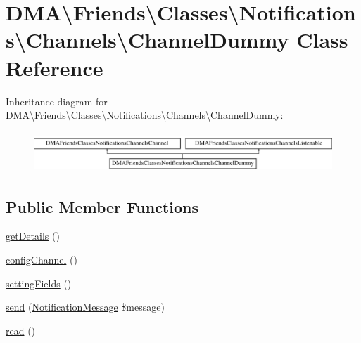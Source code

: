 \hypertarget{classDMA_1_1Friends_1_1Classes_1_1Notifications_1_1Channels_1_1ChannelDummy}{}\section{D\+M\+A\textbackslash{}Friends\textbackslash{}Classes\textbackslash{}Notifications\textbackslash{}Channels\textbackslash{}Channel\+Dummy Class Reference}
\label{classDMA_1_1Friends_1_1Classes_1_1Notifications_1_1Channels_1_1ChannelDummy}
Inheritance diagram for D\+M\+A\textbackslash{}Friends\textbackslash{}Classes\textbackslash{}Notifications\textbackslash{}Channels\textbackslash{}Channel\+Dummy\+:\begin{figure}[H]
\begin{center}
\leavevmode
\includegraphics[height=1.530055cm]{df/dc6/classDMA_1_1Friends_1_1Classes_1_1Notifications_1_1Channels_1_1ChannelDummy}
\end{center}
\end{figure}
\subsection*{Public Member Functions}
\begin{DoxyCompactItemize}
\item 
\hyperlink{classDMA_1_1Friends_1_1Classes_1_1Notifications_1_1Channels_1_1ChannelDummy_afef4152d765575a35e53950aa2eac622}{get\+Details} ()
\item 
\hyperlink{classDMA_1_1Friends_1_1Classes_1_1Notifications_1_1Channels_1_1ChannelDummy_a3e250544631beeb6eca62c50be68ba10}{config\+Channel} ()
\item 
\hyperlink{classDMA_1_1Friends_1_1Classes_1_1Notifications_1_1Channels_1_1ChannelDummy_a69940e85c68e7d14c44c708eb59cbcb0}{setting\+Fields} ()
\item 
\hyperlink{classDMA_1_1Friends_1_1Classes_1_1Notifications_1_1Channels_1_1ChannelDummy_a204876b56d42c1fc9c8fedee59a4c42c}{send} (\hyperlink{classDMA_1_1Friends_1_1Classes_1_1Notifications_1_1NotificationMessage}{Notification\+Message} \$message)
\item 
\hyperlink{classDMA_1_1Friends_1_1Classes_1_1Notifications_1_1Channels_1_1ChannelDummy_a97f9f10a70e2b6274f6b3898fc03ea10}{read} ()
\end{DoxyCompactItemize}
